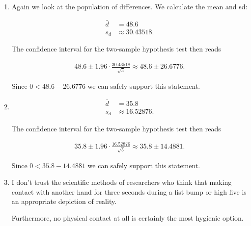 
\begin{solution}

\phantom{}

\begin{enumerate}[label = (\alph*)]
    \item Again we look at the population of differences. We calculate the mean and sd:
    
    \begin{align*}
        \bar{d} &= 48.6 \\
        s_d &\approx 30.43518.
    \end{align*}

    The confidence interval for the two-sample hypothesis test then reads

    \begin{align*}
        48.6 \pm 1.96 \cdot \frac{30.43518}{\sqrt{5}} \approx 48.6 \pm 26.6776.
    \end{align*}

    Since $0 < 48.6 - 26.6776$ we can safely support this statement.
    \item

    \begin{align*}
        \bar{d} &= 35.8 \\
        s_d &\approx 16.52876.
    \end{align*}

    The confidence interval for the two-sample hypothesis test then reads

    \begin{align*}
        35.8 \pm 1.96 \cdot \frac{16.52876}{\sqrt{5}} \approx 35.8 \pm 14.4881.
    \end{align*}

    Since $0 < 35.8 - 14.4881$ we can safely support this statement.

    \item I don't trust the scientific methods of researchers who think that
    making contact with another hand for three seconds during a fist bump or high five
    is an appropriate depiction of reality.

    Furthermore, no physical contact at all is certainly the most hygienic option.
\end{enumerate}

\end{solution}

